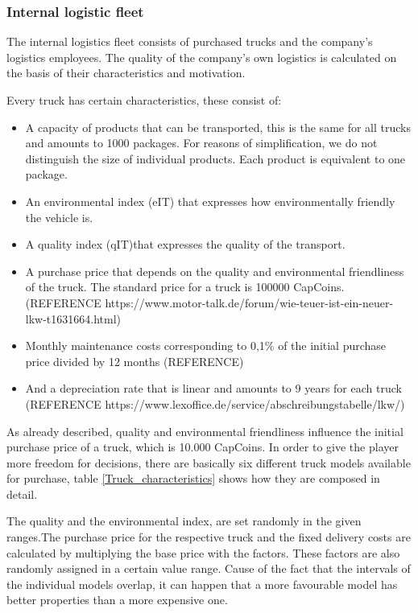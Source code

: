 \subsubsection{Internal logistic fleet}
The internal logistics fleet consists of purchased trucks and the company's logistics employees. The quality of the company's own logistics is calculated on the basis of their characteristics and motivation.

Every truck has certain characteristics, these consist of:
\begin{itemize}
    \item A capacity of products that can be transported, this is the same for all trucks and amounts to 1000 packages. For reasons of simplification, we do not distinguish the size of individual products.  Each product is equivalent to one package. 
    \item An environmental index (\gls{eIT}) that expresses how environmentally friendly the vehicle is.
    \item A quality index (\gls{qIT})that expresses the quality of the transport.
    \item A purchase price that depends on the quality and environmental friendliness of the truck. The standard price for a truck is 100000 CapCoins. (REFERENCE https://www.motor-talk.de/forum/wie-teuer-ist-ein-neuer-lkw-t1631664.html)
    \item Monthly maintenance costs corresponding to 0,1\% of the initial purchase price divided by 12 months (REFERENCE)
    \item And a depreciation rate that is linear and amounts to 9 years for each truck (REFERENCE https://www.lexoffice.de/service/abschreibungstabelle/lkw/) 
\end{itemize}

As already described, quality and environmental friendliness influence the initial purchase price of a truck, which is 10.000 CapCoins. In order to give the player more freedom for decisions, there are basically six different truck models available for purchase, table \ref{Truck_characteristics} shows how they are composed in detail. 

The quality and the environmental index, are set randomly in the given ranges.The purchase price for the respective truck and the fixed delivery costs are calculated by multiplying the base price with the factors. These factors are also randomly assigned in a certain value range. Cause of the fact that the intervals of the individual models overlap, it can happen that a more favourable model has better properties than a more expensive one.


